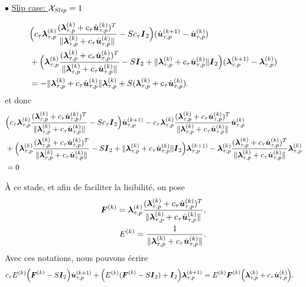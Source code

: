$\bullet$ \underline{Slip case: ${\cal X}_{Slip} = 1$}

\begin{align*}
&\Big( c_{\tau}\blambda_{\tau, p}^{(k)}\frac{(\blambda_{\tau, p}^{(k)}+c_\tau \dot\bu_{\tau, p}^{(k)})^T}{\|\blambda_{\tau, p}^{(k)}+c_\tau \dot\bu_{\tau, p}^{(k)}\|} -S c_{\tau} \bI_2\Big)(\dot\bu_{\tau, p}^{(k+1)}-\dot\bu_{\tau, p}^{(k)})\\
&+ \Big(\blambda_{\tau, p}^{(k)}\frac{(\blambda_{\tau, p}^{(k)}+c_\tau \dot\bu_{\tau, p}^{(k)})^T}{\|\blambda_{\tau, p}^{(k)}+c_\tau \dot\bu_{\tau, p}^{(k)}\|} - S\bI_2 +\|\blambda_{\tau, p}^{(k)}+c_\tau \dot\bu_{\tau, p}^{(k)}\|\bI_2\Big) (\blambda_{\tau, p}^{(k+1)}-\blambda_{\tau, p}^{(k)})\\
&=-\|\blambda_{\tau, p}^{(k)}+c_\tau \dot\bu_{\tau, p}^{(k)}\|\blambda_{\tau, p}^{(k)}+ S (\blambda_{\tau, p}^{(k)}+c_\tau \dot\bu_{\tau, p}^{(k)}).
\end{align*}
\noindent et donc
\begin{align*}
&\Big( c_{\tau}\blambda_{\tau, p}^{(k)}\frac{(\blambda_{\tau, p}^{(k)}+c_\tau \dot\bu_{\tau, p}^{(k)})^T}{\|\blambda_{\tau, p}^{(k)}+c_\tau \dot\bu_{\tau, p}^{(k)}\|} -S c_{\tau}\bI_2\Big)\dot\bu_{\tau, p}^{(k+1)}- c_{\tau}\blambda_{\tau, p}^{(k)}\frac{(\blambda_{\tau, p}^{(k)}+c_\tau \dot\bu_{\tau, p}^{(k)})^T}{\|\blambda_{\tau, p}^{(k)}+c_\tau \dot\bu_{\tau, p}^{(k)}\|}\dot\bu_{\tau, p}^{(k)}\\
&+ \Big(\blambda_{\tau, p}^{(k)}\frac{(\blambda_{\tau, p}^{(k)}+c_\tau \dot\bu_{\tau, p}^{(k)})^T}{\|\blambda_{\tau, p}^{(k)}+c_\tau \dot\bu_{\tau, p}^{(k)}\|} - S\bI_2 +\|\blambda_{\tau, p}^{(k)}+c_\tau \dot\bu_{\tau, p}^{(k)}\|\bI_2\Big) \blambda_{\tau, p}^{(k+1)}- \blambda_{\tau, p}^{(k)}\frac{(\blambda_{\tau, p}^{(k)}+c_\tau \dot\bu_{\tau, p}^{(k)})^T}{\|\blambda_{\tau, p}^{(k)}+c_\tau \dot\bu_{\tau, p}^{(k)}\|}\blambda_{\tau, p}^{(k)}\\
&=0
\end{align*}

\noindent À ce stade, et afin de faciliter la lisibilité, on pose
\begin{align*}
\bF^{(k)}=\blambda_{\tau, p}^{(k)}\frac{(\blambda_{\tau, p}^{(k)}+c_\tau \dot\bu_{\tau, p}^{(k)})^T}{\|\blambda_{\tau, p}^{(k)}+c_\tau \dot\bu_{\tau, p}^{(k)}\|},\\
E^{(k)}=\frac{1}{\|\blambda_{\tau, p}^{(k)}+c_\tau \dot\bu_{\tau, p}^{(k)}\|}.
\end{align*}
Avec ces notations, nous pouvons écrire
\begin{align*}
&c_{\tau}E^{(k)}\Big( \bF^{(k)} -S\bI_2 \Big)\dot\bu_{\tau, p}^{(k+1)}+ \Big(E^{(k)}(\bF^{(k)} - S\bI_2) +\bI_2\Big) \blambda_{\tau, p}^{(k+1)}= E^{(k)}\bF^{(k)} \Big(\blambda_{\tau, p}^{(k)}+ c_{\tau}\dot\bu_{\tau, p}^{(k)}\Big).
\end{align*}

